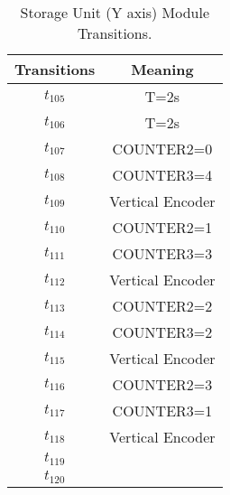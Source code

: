 \begin{table}[htbp]
\caption{Storage Unit (Y axis) Module Transitions.}
\centering
\begin{tabular}{cc}
Transitions & Meaning\\
\hline
\hyperlink{partialNet:tt105}{\hypertarget{partialTable:tt105}{$t_{105}$}} & T=2s\\
\hyperlink{partialNet:tt106}{\hypertarget{partialTable:tt106}{$t_{106}$}} & T=2s\\
\hyperlink{partialNet:t107}{\hypertarget{partialTable:t107}{$t_{107}$}} & COUNTER2=0\\
\hyperlink{partialNet:t108}{\hypertarget{partialTable:t108}{$t_{108}$}} & COUNTER3=4\\
\hyperlink{partialNet:t109}{\hypertarget{partialTable:t109}{$t_{109}$}} & Vertical Encoder\\
\hyperlink{partialNet:t110}{\hypertarget{partialTable:t110}{$t_{110}$}} & COUNTER2=1\\
\hyperlink{partialNet:t111}{\hypertarget{partialTable:t111}{$t_{111}$}} & COUNTER3=3\\
\hyperlink{partialNet:t112}{\hypertarget{partialTable:t112}{$t_{112}$}} & Vertical Encoder\\
\hyperlink{partialNet:t113}{\hypertarget{partialTable:t113}{$t_{113}$}} & COUNTER2=2\\
\hyperlink{partialNet:t114}{\hypertarget{partialTable:t114}{$t_{114}$}} & COUNTER3=2\\
\hyperlink{partialNet:t115}{\hypertarget{partialTable:t115}{$t_{115}$}} & Vertical Encoder\\
\hyperlink{partialNet:t116}{\hypertarget{partialTable:t116}{$t_{116}$}} & COUNTER2=3\\
\hyperlink{partialNet:t117}{\hypertarget{partialTable:t117}{$t_{117}$}} & COUNTER3=1\\
\hyperlink{partialNet:t118}{\hypertarget{partialTable:t118}{$t_{118}$}} & Vertical Encoder\\
\hyperlink{partialNet:t119}{\hypertarget{partialTable:t119}{$t_{119}$}} & \\
\hyperlink{partialNet:t120}{\hypertarget{partialTable:t120}{$t_{120}$}} & \\
\end{tabular}
\end{table}
